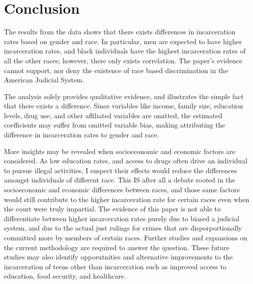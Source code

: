 \documentclass{article}
\begin{document}
\newpage

\section{Conclusion}

The results from the data shows that there exists differences in incarceration rates based on gender and race. In particular, men are expected to have higher incarceration rates, and black individuals have the highest incarceration rates of all the other races; however, there only exists correlation. The paper's evidence cannot support, nor deny the existence of race based discrimination in the American Judicial System. 

The analysis solely provides qualitative evidence, and illustrates the simple fact that there exists a difference. Since variables like income, family size, education levels, drug use, and other affiliated variables are omitted, the estimated coefficients may suffer from omitted variable bias, making attributing the difference in incarceration rates to gender and race. 

More insights may be revealed when socioeconomic and economic factors are considered. As low education rates, and access to drugs often drive an individual to pursue illegal activities, I suspect their effects would reduce the differences amongst individuals of different race. This IS after all a debate rooted in the socioeconomic and economic differences between races, and those same factors would still contribute to the higher incarceration rate for certain races even when the court were truly impartial. The evidence of this paper is not able to differentiate between higher incarceration rates purely due to biased a judicial system, and due to the actual just rulings for crimes that are disporportionally committed more by members of certain races. Further studies and expansions on the current methodology are required to answer the question. These future studies may also identify opporutnities and alternative improvements to the incarceration of teens other than incarceration such as improved access to education, food security, and healthcare.
\end{document}
